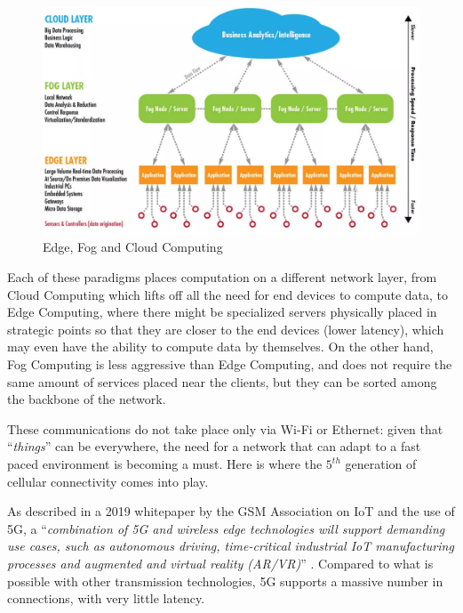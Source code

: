 			\begin{figure}[h]
				\centering
				\includegraphics[width=\textwidth]{resources/img/chap2/computing_paradigms}
				\caption{Edge, Fog and Cloud Computing}
				\label{computing_paradigms}
			\end{figure}
		
			Each of these paradigms places computation on a different network layer, from Cloud Computing which lifts off all the need for end devices to compute data, to Edge Computing, where there might be specialized servers physically placed in strategic points so that they are closer to the end devices (lower latency), which may even have the ability to compute data by themselves.
			On the other hand, Fog Computing is less aggressive than Edge Computing, and does not require the same amount of services placed near the clients, but they can be sorted among the backbone of the network.
			
			These communications do not take place only via Wi-Fi or Ethernet: given that ``\textit{things}'' can be everywhere, the need for a network that can adapt to a fast paced environment is becoming a must.
			Here is where the $5^{th}$ generation of cellular connectivity comes into play.
			
			As described in a 2019 whitepaper by the GSM Association on IoT and the use of 5G, a ``\textit{combination of 5G and wireless edge technologies will support demanding  use cases, such as autonomous driving, time-critical industrial IoT manufacturing processes and  augmented and virtual reality (AR/VR)}'' \cite{IoT_5g_era}.
			Compared to what is possible with other transmission technologies, 5G supports a massive number in connections, with very little latency.
				
